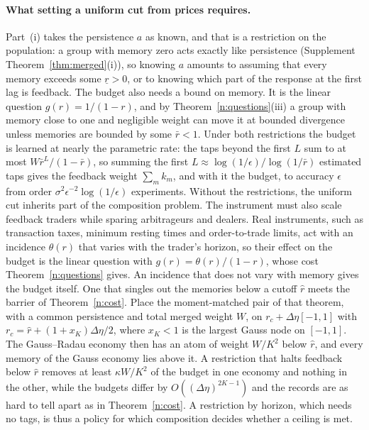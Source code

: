 \documentclass[12pt]{article}
\theoremstyle{definition}
\theoremstyle{remark}
\begin{document}
\paragraph{What setting a uniform cut from prices requires.} Part~(i) takes the persistence $a$ as known, and that is a restriction on the population: a group with memory zero acts exactly like persistence (Supplement Theorem~\ref{thm:merged}(i)), so knowing $a$ amounts to assuming that every memory exceeds some $\underline r>0$, or to knowing which part of the response at the first lag is feedback. The budget also needs a bound on memory. It is the linear question $g(r)=1/(1-r)$, and by Theorem~\ref{n:questions}(iii) a group with memory close to one and negligible weight can move it at bounded divergence unless memories are bounded by some $\bar r<1$. Under both restrictions the budget is learned at nearly the parametric rate: the taps beyond the first $L$ sum to at most $W\bar r^{L}/(1-\bar r)$, so summing the first $L\approx\log(1/\epsilon)/\log(1/\bar r)$ estimated taps gives the feedback weight $\sum_mk_m$, and with it the budget, to accuracy $\epsilon$ from order $\sigma^2\epsilon^{-2}\log(1/\epsilon)$ experiments. Without the restrictions, the uniform cut inherits part of the composition problem. The instrument must also scale feedback traders while sparing arbitrageurs and dealers. Real instruments, such as transaction taxes, minimum resting times and order-to-trade limits, act with an incidence $\theta(r)$ that varies with the trader's horizon, so their effect on the budget is the linear question with $g(r)=\theta(r)/(1-r)$, whose cost Theorem~\ref{n:questions} gives. An incidence that does not vary with memory gives the budget itself. One that singles out the memories below a cutoff $\hat r$ meets the barrier of Theorem~\ref{n:cost}. Place the moment-matched pair of that theorem, with a common persistence and total merged weight $W$, on $r_c+\Delta\eta[-1,1]$ with $r_c=\hat r+(1+x_K)\Delta\eta/2$, where $x_K<1$ is the largest Gauss node on $[-1,1]$. The Gauss--Radau economy then has an atom of weight $W/K^2$ below $\hat r$, and every memory of the Gauss economy lies above it. A restriction that halts feedback below $\hat r$ removes at least $\kappa W/K^2$ of the budget in one economy and nothing in the other, while the budgets differ by $O((\Delta\eta)^{2K-1})$ and the records are as hard to tell apart as in Theorem~\ref{n:cost}. A restriction by horizon, which needs no tags, is thus a policy for which composition decides whether a ceiling is met.
\end{document}
